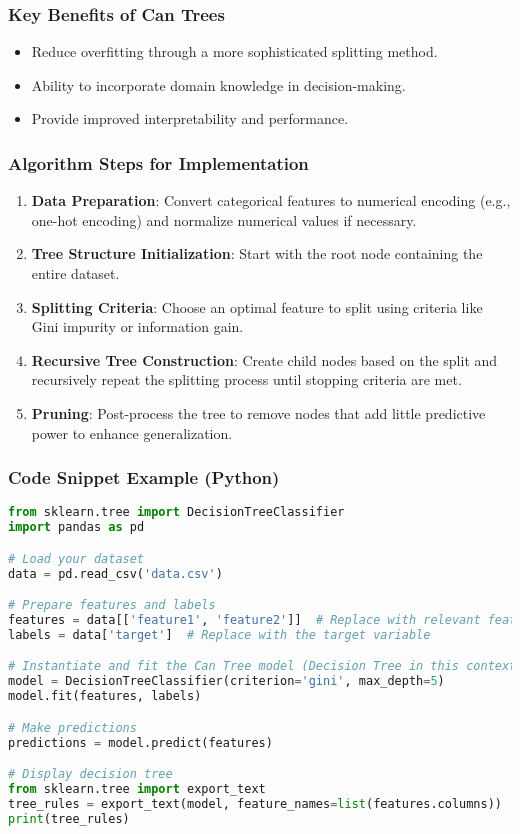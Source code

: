 \documentclass[aspectratio=169]{beamer}
\begin{document}
\begin{frame}
    \frametitle{Key Benefits of Can Trees}
    \begin{itemize}
        \item Reduce overfitting through a more sophisticated splitting method.
        \item Ability to incorporate domain knowledge in decision-making.
        \item Provide improved interpretability and performance.
    \end{itemize}
\end{frame}

\begin{frame}
    \frametitle{Algorithm Steps for Implementation}
    \begin{enumerate}
        \item \textbf{Data Preparation}: Convert categorical features to numerical encoding (e.g., one-hot encoding) and normalize numerical values if necessary.
        \item \textbf{Tree Structure Initialization}: Start with the root node containing the entire dataset.
        \item \textbf{Splitting Criteria}: Choose an optimal feature to split using criteria like Gini impurity or information gain.
        \item \textbf{Recursive Tree Construction}: Create child nodes based on the split and recursively repeat the splitting process until stopping criteria are met.
        \item \textbf{Pruning}: Post-process the tree to remove nodes that add little predictive power to enhance generalization.
    \end{enumerate}
\end{frame}

\begin{frame}[fragile]
    \frametitle{Code Snippet Example (Python)}
    \begin{lstlisting}[language=Python]
from sklearn.tree import DecisionTreeClassifier
import pandas as pd

# Load your dataset
data = pd.read_csv('data.csv')

# Prepare features and labels
features = data[['feature1', 'feature2']]  # Replace with relevant features
labels = data['target']  # Replace with the target variable

# Instantiate and fit the Can Tree model (Decision Tree in this context)
model = DecisionTreeClassifier(criterion='gini', max_depth=5)
model.fit(features, labels)

# Make predictions
predictions = model.predict(features)

# Display decision tree
from sklearn.tree import export_text
tree_rules = export_text(model, feature_names=list(features.columns))
print(tree_rules)
    \end{lstlisting}
\end{frame}
\end{document}
